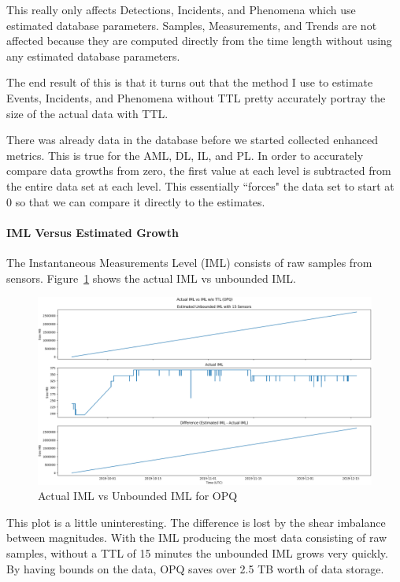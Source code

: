 This really only affects Detections, Incidents, and Phenomena which use estimated database parameters. Samples, Measurements, and Trends are not affected because they are computed directly from the time length without using any estimated database parameters.

The end result of this is that it turns out that the method I use to estimate Events, Incidents, and Phenomena without TTL pretty accurately portray the size of the actual data with TTL.

There was already data in the database before we started collected enhanced metrics. This is true for the AML, DL, IL, and PL. In order to accurately compare data growths from zero, the first value at each level is subtracted from the entire data set at each level. This essentially ``forces" the data set to start at 0 so that we can compare it directly to the estimates.

\paragraph{IML Versus Estimated Growth}
The Instantaneous Measurements Level (IML) consists of raw samples from sensors. Figure~\ref{fig:actual_iml_vs_unbounded_opq} shows the actual IML vs unbounded IML\@.

\begin{figure}[H]
    \centering
    \includegraphics[width=\linewidth]{figures/actual_iml_vs_unbounded_opq.png}
    \caption{Actual IML vs Unbounded IML for OPQ}
    \label{fig:actual_iml_vs_unbounded_opq}
\end{figure}

This plot is a little uninteresting. The difference is lost by the shear imbalance between magnitudes. With the IML producing the most data consisting of raw samples, without a TTL of 15 minutes the unbounded IML grows very quickly. By having bounds on the data, OPQ saves over 2.5 TB worth of data storage.

